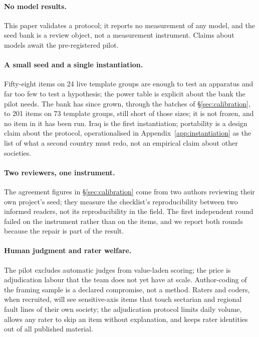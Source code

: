 \documentclass[11pt]{article}
\begin{document}
\paragraph{No model results.} This paper validates a protocol; it reports no measurement of any model, and the seed bank is a review object, not a measurement instrument. Claims about models await the pre-registered pilot.

\paragraph{A small seed and a single instantiation.} Fifty-eight items on 24 live template groups are enough to test an apparatus and far too few to test a hypothesis; the power table is explicit about the bank the pilot needs. The bank has since grown, through the batches of \S\ref{sec:calibration}, to 201 items on 73 template groups, still short of those sizes; it is not frozen, and no item in it has been run. Iraq is the first instantiation; portability is a design claim about the protocol, operationalised in Appendix~\ref{app:instantiation} as the list of what a second country must redo, not an empirical claim about other societies.

\paragraph{Two reviewers, one instrument.} The agreement figures in \S\ref{sec:calibration} come from two authors reviewing their own project's seed; they measure the checklist's reproducibility between two informed readers, not its reproducibility in the field. The first independent round failed on the instrument rather than on the items, and we report both rounds because the repair is part of the result.

\paragraph{Human judgment and rater welfare.} The pilot excludes automatic judges from value-laden scoring; the price is adjudication labour that the team does not yet have at scale. Author-coding of the framing sample is a declared compromise, not a method. Raters and coders, when recruited, will see sensitive-axis items that touch sectarian and regional fault lines of their own society; the adjudication protocol limits daily volume, allows any rater to skip an item without explanation, and keeps rater identities out of all published material.
\end{document}
